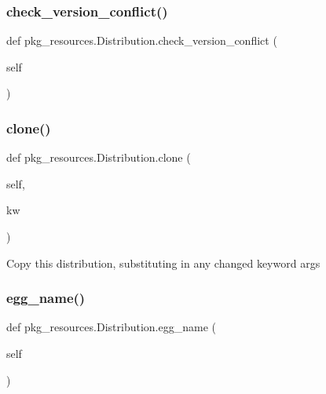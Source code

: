 \subsubsection{\texorpdfstring{check\+\_\+version\+\_\+conflict()}{check\_version\_conflict()}}
{\footnotesize\ttfamily def pkg\+\_\+resources.\+Distribution.\+check\+\_\+version\+\_\+conflict (\begin{DoxyParamCaption}\item[{}]{self }\end{DoxyParamCaption})}

\mbox{\label{classpkg__resources_1_1Distribution_ad737fac85435aff74ecb2fab234ba930}} 
\subsubsection{\texorpdfstring{clone()}{clone()}}
{\footnotesize\ttfamily def pkg\+\_\+resources.\+Distribution.\+clone (\begin{DoxyParamCaption}\item[{}]{self,  }\item[{}]{kw }\end{DoxyParamCaption})}

\begin{DoxyVerb}Copy this distribution, substituting in any changed keyword args\end{DoxyVerb}
 \mbox{\label{classpkg__resources_1_1Distribution_a229d424f62d10b7e83bba3b3efe6dbbb}} 
\subsubsection{\texorpdfstring{egg\+\_\+name()}{egg\_name()}}
{\footnotesize\ttfamily def pkg\+\_\+resources.\+Distribution.\+egg\+\_\+name (\begin{DoxyParamCaption}\item[{}]{self }\end{DoxyParamCaption})}

